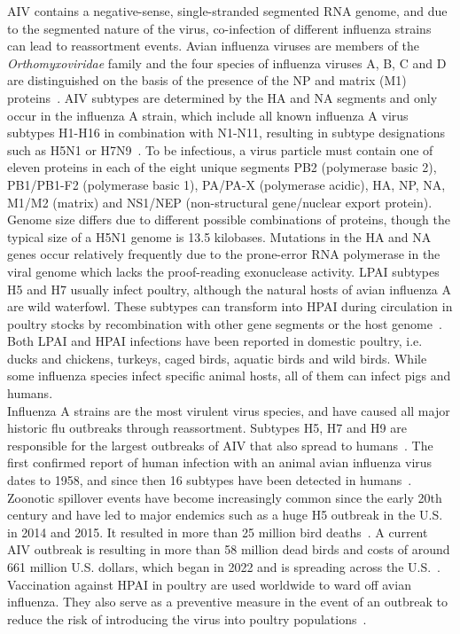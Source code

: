 \ac{AIV} contains a negative-sense, single-stranded segmented \ac{RNA} genome, and due to the segmented nature of the virus, co-infection of different influenza strains can lead to reassortment events. Avian influenza viruses are members of the \textit{Orthomyxoviridae} family and the four species of influenza viruses A, B, C and D are distinguished on the basis of the presence of the \ac{NP} and matrix (M1) proteins~\cite{webster1992evolution}. \ac{AIV} subtypes are determined by the \ac{HA} and \ac{NA} segments and only occur in the influenza A strain, which include all known influenza A virus subtypes H1-H16 in combination with N1-N11, resulting in subtype designations such as H5N1 or H7N9~\cite{webster1992evolution, krammer2018influenza}. To be infectious, a virus particle must contain one of eleven proteins in each of the eight unique segments PB2 (polymerase basic 2), PB1/PB1-F2 (polymerase basic 1), PA/PA-X (polymerase acidic), \ac{HA}, \ac{NP}, \ac{NA}, M1/M2 (matrix) and NS1/NEP (non-structural gene/nuclear export protein). Genome size differs due to different possible combinations of proteins, though the typical size of a H5N1 genome is 13.5 kilobases. Mutations in the \ac{HA} and \ac{NA} genes occur relatively frequently due to the prone-error \ac{RNA} polymerase in the viral genome which lacks the proof-reading exonuclease activity. \ac{LPAI} subtypes H5 and H7 usually infect poultry, although the natural hosts of avian influenza A are wild waterfowl. These subtypes can transform into \ac{HPAI} during circulation in poultry stocks by recombination with other gene segments or the host genome~\cite{webster2006h5n1}. Both \ac{LPAI} and \ac{HPAI} infections have been reported in domestic poultry, i.e. ducks and chickens, turkeys, caged birds, aquatic birds and wild birds. While some influenza species infect specific animal hosts, all of them can infect pigs and humans. \\
Influenza A strains are the most virulent virus species, and have caused all major historic flu outbreaks through reassortment. Subtypes H5, H7 and H9 are responsible for the largest outbreaks of \ac{AIV} that also spread to humans~\cite{widdowson2017global}. The first confirmed report of human infection with an animal avian influenza virus dates to 1958, and since then 16 subtypes have been detected in humans~\cite{kluska1961demonstration}. Zoonotic spillover events have become increasingly common since the early 20th century and have led to major endemics such as a huge H5 outbreak in the U.S. in 2014 and 2015. It resulted in more than 25 million bird deaths~\cite{seeger2021poultry}. A current \ac{AIV} outbreak is resulting in more than 58 million dead birds and costs of around 661 million U.S. dollars, which began in 2022 and is spreading across the U.S.~\cite{usda2023hpai}. 
Vaccination against \ac{HPAI} in poultry are used worldwide to ward off avian influenza. They also serve as a preventive measure in the event of an outbreak to reduce the risk of introducing the virus into poultry populations~\cite{swayne2013current, swayne2011assessment}. 

